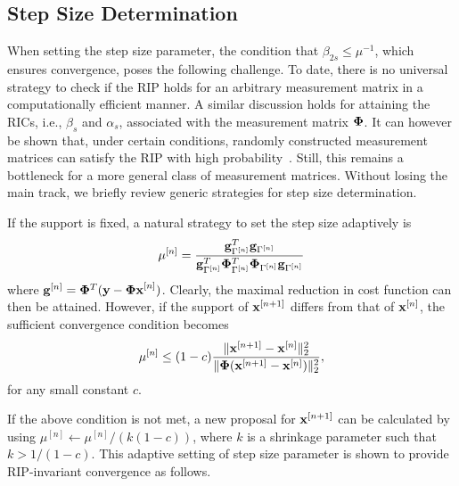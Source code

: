 \documentclass[aoas,preprint]{imsart}
\numberwithin{equation}{section}
\theoremstyle{plain}
\begin{document}
\subsection{Step Size Determination} 
When setting the step size parameter, the condition that $\beta_{2s}\leq\mu^{-1}$, which ensures convergence, poses the following challenge. To date, there is no universal strategy  to check if the RIP holds for an arbitrary measurement matrix in a computationally efficient manner. A similar discussion holds for attaining the RICs, i.e., ${\beta_s}$ and $\alpha_s$, associated with the measurement matrix ${\bf \Phi}$. It can however be shown that, under certain conditions, randomly constructed measurement matrices can satisfy
the RIP with high probability~\cite{candes2008rip, chartrand2008rip}. Still, this remains a bottleneck for a more general class of
measurement matrices. Without losing the main track, we briefly review generic strategies for step size determination. 
\vspace{0.5em}

If the support is fixed, a natural strategy to set the step size adaptively is~\cite{blumensath2010niht}
\begin{equation}\label{step_size}
   \mu^{[n]} = \frac{{\bf g}^T_{\Gamma^{[n]}}{\bf g}_{\Gamma^{[n]}}}{{\bf g}^T_{\Gamma^{[n]}}{\bf \Phi}^T_{\Gamma^{[n]}}{\bf \Phi}_{\Gamma^{[n]}}{\bf g}_{\Gamma^{[n]}}}
\end{equation}
where ${\bf g}^{[n]} = {\bf \Phi}^T({\bf y}-{\bf \Phi x}^{[n]})$. Clearly, the maximal reduction in cost function can then be attained. However, if the support of ${\bf x}^{[n+1]}$ differs from that of ${\bf x}^{[n]}$, the sufficient convergence condition  becomes
\begin{equation}
    \mu^{[n]} \leq(1-c) \frac{\|{\bf x}^{[n+1]}-{\bf x}^{[n]} \|_2^2}{\|{\bf \Phi}({\bf x}^{[n+1]}-{\bf x}^{[n]}) \|_2^2},
\end{equation}
for any small constant $c$.
\vspace{0.5em}

If the above condition is not met, a new proposal for ${\bf x}^{[n+1]}$ can be calculated by using $\mu^{[n]}\leftarrow{\mu^{[n]}/(k(1-c))}$, where $k$ is a shrinkage parameter such that $k>1/(1-c)$.
This adaptive setting of step size parameter is shown to provide RIP-invariant convergence  as follows.
\end{document}
